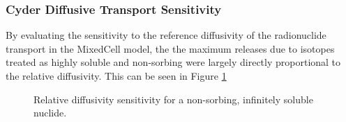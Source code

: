 
\begin{frame}[ctb!]
\frametitle{Cyder Diffusive Transport Sensitivity}
By evaluating the sensitivity to the reference 
diffusivity of the radionuclide transport in the MixedCell model, the 
the maximum releases due to isotopes treated as highly soluble and non-sorbing
were largely directly proportional to the relative diffusivity. 
This can be seen in Figure \ref{fig:mixed_diff} 
\begin{figure}[ht]
\centering
\caption{Relative diffusivity sensitivity for a non-sorbing, infinitely soluble 
nuclide.}
\label{fig:mixed_diff}
\end{figure}
\end{frame}
